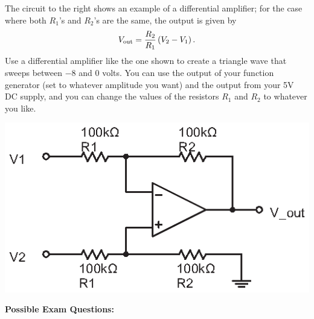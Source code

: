 \begin{enumerate}[wide]
\medskip
\begin{minipage}{.53\textwidth}
\item The circuit to the right shows an example of a differential amplifier; for the case where both $R_1$'s and $R_2$'s are the same, the output is given by  \label{part_differential}
\begin{equation*}
V_{\rm out} = \frac{R_2}{R_1} \left( V_2 - V_1 \right).
\end{equation*}
Use a differential amplifier like the one shown to create a triangle wave that sweeps between $-8$ and
0 volts.  You can use the output of your function generator (set to whatever amplitude you want) 
and the output from your 5V DC supply, and you can change the values of the resistors $R_1$ and $R_2$ to whatever you like.  
\end{minipage}
\begin{minipage}{.46\textwidth}
\begin{flushright}
\includegraphics{op-amps/differential_amp.eps}

\end{flushright}
\end{minipage}



\end{enumerate}

\pagebreak[2]
\textbf{Possible Exam Questions:}

